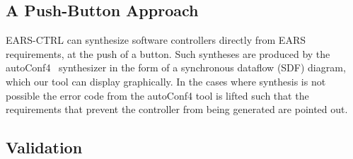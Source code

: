 \subsection{A Push-Button Approach}

\textsf{EARS-CTRL} can synthesize software controllers directly from EARS
requirements, at the push of a button. Such syntheses are produced 
by the \textsf{autoConf4}~\cite{autoCode17} synthesizer in the form
of a synchronous dataflow (SDF) diagram, which our tool can display
graphically. In the cases where synthesis is not possible the error code from
the \textsf{autoConf4} tool is lifted such that the requirements that prevent
the controller from being generated are pointed out.\vspace{-.5cm} 

\subsection{Validation}
\vspace{-.2cm}

